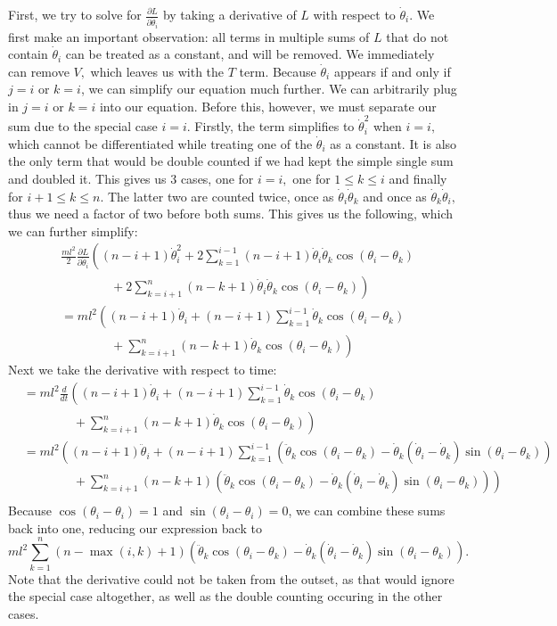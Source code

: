 \documentclass{article}
\begin{document}
First, we try to solve for $\frac{\partial L}{\partial \dot \theta_i}$ by taking a derivative of $L$ with respect to $\dot\theta_i$. We first make an important observation: all terms in multiple sums of $L$ that do not contain $\dot\theta_i$ can be treated as a constant, and will be removed. We immediately can remove $V,$ which leaves us with the $T$ term. Because $\dot\theta_i$ appears if and only if $j=i$ or $k=i$, we can simplify our equation much further. We can arbitrarily plug in $j=i$ or $k=i$ into our equation. Before this, however, we must separate our sum due to the special case $i=i$. Firstly, the term simplifies to $\dot\theta_i^2$ when $i=i,$ which cannot be differentiated while treating one of the $\dot\theta_i$ as a constant. It is also the only term that would be double counted if we had kept the simple single sum and doubled it. This gives us 3 cases, one for $i=i,$ one for $1\leq k\le i$ and finally for $i+1\leq k \leq n$. The latter two are counted twice, once as $\dot\theta_i\dot\theta_k$ and once as $\dot\theta_k\dot\theta_i,$ thus we need a factor of two before both sums. This gives us the following, which we can further simplify:
\begin{align*}
&\frac{ml^2}{2}\frac{\partial L}{\partial \dot \theta_i}\left((n-i+1)\dot\theta_i^2 + 2\sum_{k=1}^{i-1}(n-i+1)\dot\theta_i\dot\theta_k\cos(\theta_i-\theta_k)\right.\\
&\qquad\qquad+ \left.2\sum_{k=i+1}^n(n-k+1)\dot\theta_i\dot\theta_k\cos(\theta_i-\theta_k)\right)\\
&= ml^2\left((n-i+1)\dot\theta_i + (n-i+1)\sum_{k=1}^{i-1}\dot\theta_k\cos(\theta_i-\theta_k)\right.\\
&\qquad\qquad+ \left.\sum_{k=i+1}^n(n-k+1)\dot\theta_k\cos(\theta_i-\theta_k)\right)
\end{align*}
Next we take the derivative with respect to time:
\begin{align*}
&= ml^2\frac{d}{dt}\left((n-i+1)\dot\theta_i + (n-i+1)\sum_{k=1}^{i-1}\dot\theta_k\cos(\theta_i-\theta_k)\right.\\
&\qquad\qquad+ \left.\sum_{k=i+1}^n(n-k+1)\dot\theta_k\cos(\theta_i-\theta_k)\right)\\
&= ml^2\left((n-i+1)\ddot\theta_i + (n-i+1)\sum_{k=1}^{i-1}\left(\ddot\theta_k\cos(\theta_i-\theta_k)-\dot\theta_k(\dot\theta_i-\dot\theta_k)\sin(\theta_i-\theta_k)\right)\right.\\
&\qquad\qquad+ \left.\sum_{k=i+1}^n(n-k+1)\left(\ddot\theta_k\cos(\theta_i-\theta_k)-\dot\theta_k(\dot\theta_i-\dot\theta_k)\sin(\theta_i-\theta_k)\right)\right)\\
\end{align*}
Because $\cos(\theta_i-\theta_i)=1$ and $\sin(\theta_i-\theta_i)=0$, we can combine these sums back into one, reducing our expression back to
$$ml^2\sum_{k=1}^n(n-\max(i,k)+1)\left(\ddot\theta_k\cos(\theta_i-\theta_k)-\dot\theta_k(\dot\theta_i-\dot\theta_k)\sin(\theta_i-\theta_k)\right).$$
Note that the derivative could not be taken from the outset, as that would ignore the special case altogether, as well as the double counting occuring in the other cases.
\end{document}
